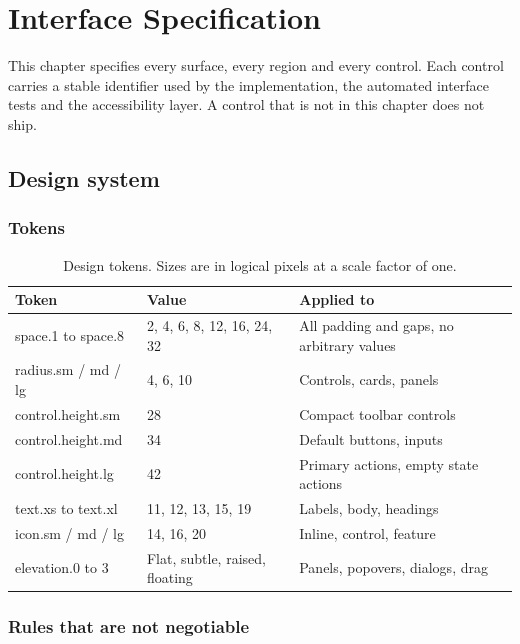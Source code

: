 \chapter{Interface Specification}
\label{ch:interface}

This chapter specifies every surface, every region and every control. Each control carries a
stable identifier used by the implementation, the automated interface tests and the
accessibility layer. A control that is not in this chapter does not ship.

\section{Design system}

\subsection{Tokens}

\begin{table}[h]
\centering
\small
\begin{tabularx}{\textwidth}{l l X}
\toprule
\textbf{Token} & \textbf{Value} & \textbf{Applied to} \\
\midrule
space.1 to space.8 & 2, 4, 6, 8, 12, 16, 24, 32 & All padding and gaps, no arbitrary values \\
radius.sm / md / lg & 4, 6, 10 & Controls, cards, panels \\
control.height.sm & 28 & Compact toolbar controls \\
control.height.md & 34 & Default buttons, inputs \\
control.height.lg & 42 & Primary actions, empty state actions \\
text.xs to text.xl & 11, 12, 13, 15, 19 & Labels, body, headings \\
icon.sm / md / lg & 14, 16, 20 & Inline, control, feature \\
elevation.0 to 3 & Flat, subtle, raised, floating & Panels, popovers, dialogs, drag \\
\bottomrule
\end{tabularx}
\caption{Design tokens. Sizes are in logical pixels at a scale factor of one.}
\end{table}

\subsection{Rules that are not negotiable}

